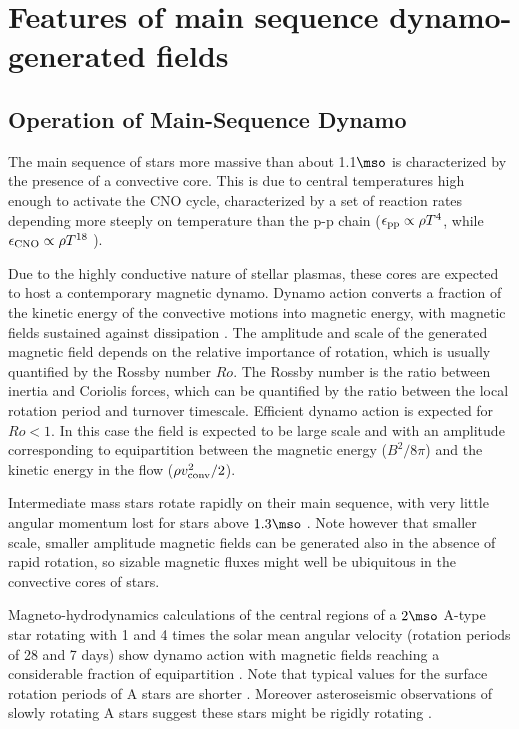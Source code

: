 \section{Features of main sequence dynamo-generated fields}

\subsection{Operation of Main-Sequence Dynamo}

The main sequence of stars more massive than about 1.1$\mso$ is characterized by the presence of a convective core.
This is due to central temperatures high enough to activate the CNO cycle, characterized by a set of reaction rates depending more steeply on temperature than the p-p chain ($\epsilon_{\rm pp}\propto \rho T^{4}$, while $\epsilon_{\rm CNO}\propto \rho T^{18}$ ).

Due to the highly conductive nature of stellar plasmas, 
these cores are expected to host a contemporary magnetic dynamo. Dynamo action converts a fraction of the kinetic energy 
of the convective motions into magnetic energy, with magnetic fields sustained against dissipation  \citep[see e.g.,][]{Brandenburg_2005}. The amplitude and scale of the generated magnetic field depends on the relative importance of rotation, which is usually quantified by the Rossby number $Ro$. The Rossby number is the ratio between inertia and Coriolis forces, which can be quantified by the ratio between the local rotation period and turnover timescale. 
Efficient dynamo action is expected for $Ro<1$. In this case the field is expected to be large scale and with an amplitude corresponding to equipartition between the magnetic energy ($B^2/8\pi$) and the kinetic energy in the flow ($\rho v^2_{\rm conv}/2$). 

Intermediate mass stars rotate rapidly on their main sequence, with very little angular momentum lost for stars above $1.3\mso$ \citep[Kraft break, see e.g.]{1967ApJ...150..551K,2013ApJ...776...67V}.
Note however that smaller scale, smaller amplitude magnetic fields can be generated also in the absence of rapid rotation, so sizable magnetic fluxes might well be ubiquitous in the convective cores of stars. 

Magneto-hydrodynamics calculations of the central regions of a $2\mso$ A-type star rotating with 
1 and 4 times the solar mean angular velocity (rotation periods of 28 and 7 days) show dynamo action 
with magnetic fields reaching a considerable fraction of equipartition \citep{Brun_2005}. Note that typical values for the surface  rotation periods of A stars are shorter \citep[about 1 day, see e.g.]{Zorec_2012}. Moreover asteroseismic observations of slowly rotating A stars suggest these stars might be rigidly rotating \cite{Kurtz_2014}.

